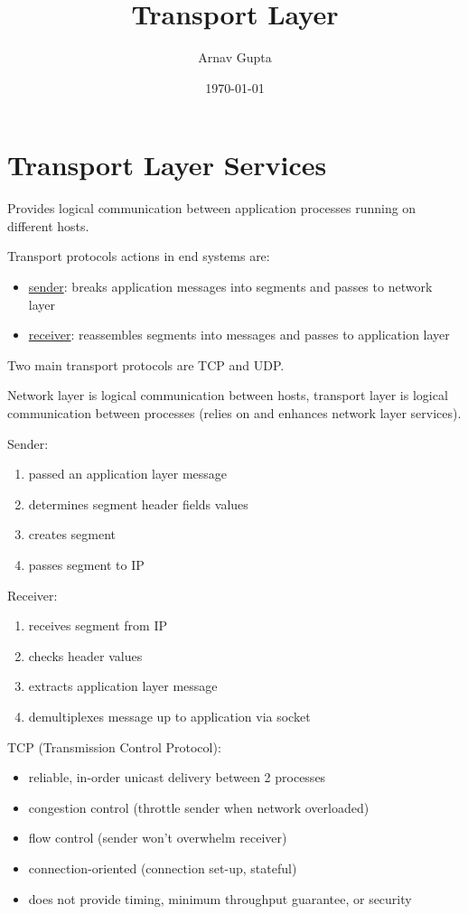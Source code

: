 \documentclass[11pt]{article}
\author{Arnav Gupta}
\date{\today}
\title{Transport Layer}
\begin{document}
\maketitle
\tableofcontents

\section{Transport Layer Services}
\label{sec:org1d83399}
Provides logical communication between application processes running on
different hosts.

Transport protocols actions in end systems are:
\begin{itemize}
\item \uline{sender}: breaks application messages into segments and passes to network
layer
\item \uline{receiver}: reassembles segments into messages and passes to application layer
\end{itemize}

Two main transport protocols are TCP and UDP.

Network layer is logical communication between hosts, transport layer is logical
communication between processes (relies on and enhances network layer services).

Sender:
\begin{enumerate}
\item passed an application layer message
\item determines segment header fields values
\item creates segment
\item passes segment to IP
\end{enumerate}

Receiver:
\begin{enumerate}
\item receives segment from IP
\item checks header values
\item extracts application layer message
\item demultiplexes message up to application via socket
\end{enumerate}

TCP (Transmission Control Protocol):
\begin{itemize}
\item reliable, in-order unicast delivery between 2 processes
\item congestion control (throttle sender when network overloaded)
\item flow control (sender won't overwhelm receiver)
\item connection-oriented (connection set-up, stateful)
\item does not provide timing, minimum throughput guarantee, or security
\end{itemize}
\end{document}
